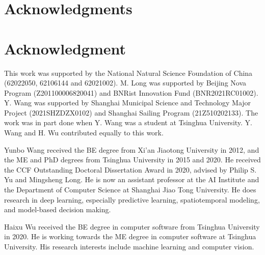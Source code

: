 \documentclass[10pt,journal,compsoc]{IEEEtran}
\begin{document}
\ifCLASSOPTIONcompsoc
\section*{Acknowledgments}
\else
\section*{Acknowledgment}
\fi


This work was supported by the National Natural Science Foundation of China (62022050, 62106144 and 62021002). 
M. Long was supported by Beijing Nova Program (Z201100006820041) and BNRist Innovation Fund (BNR2021RC01002).
Y. Wang was supported by Shanghai Municipal Science and Technology Major Project (2021SHZDZX0102) and Shanghai Sailing Program (21Z510202133). 
The work was in part done when Y. Wang was a student at Tsinghua University. Y. Wang and H. Wu contributed equally to this work.






\ifCLASSOPTIONcaptionsoff
  \newpage
\fi




















\vspace{-30pt}
\begin{IEEEbiography}{Yunbo Wang} received the BE degree from Xi'an Jiaotong University in 2012, and the ME and PhD degrees from Tsinghua University in 2015 and 2020. He received the CCF Outstanding Doctoral Dissertation Award in 2020, advised by Philip S. Yu and Mingsheng Long. He is now an assistant professor at the AI Institute and the Department of Computer Science at Shanghai Jiao Tong University. He does research in deep learning, especially predictive learning, spatiotemporal modeling, and model-based decision making. 
\end{IEEEbiography}

\vspace{-30pt}
\begin{IEEEbiography}{Haixu Wu} received the BE degree in computer software from Tsinghua University in 2020. He is working towards the ME degree in computer software at Tsinghua University. His research interests include machine learning and computer vision.
\end{IEEEbiography}
\end{document}
